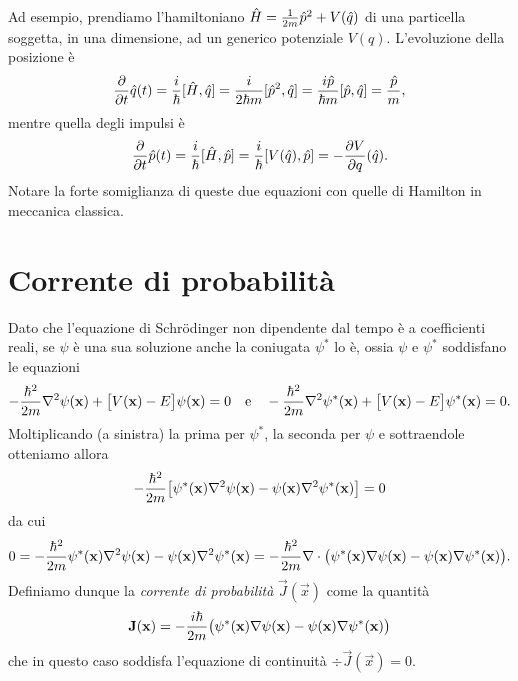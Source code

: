 Ad esempio, prendiamo l'hamiltoniano $\hat{H}=\frac1{2m}\hat{p}^2+V(\hat{q})$ di una particella soggetta, in una dimensione, ad un generico potenziale $V(q)$.
L'evoluzione della posizione è
\begin{equation}
	\frac{\partial {}}{\partial {t}}\hat{q}(t)=\frac{i}{\hbar}[\hat{H},\hat{q}]=\frac{i}{2\hbar m}[\hat{p}^2,\hat{q}]=\frac{i\hat{p}}{\hbar m}[\hat{p},\hat{q}]=\frac{\hat{p}}{m},
\end{equation}
mentre quella degli impulsi è
\begin{equation}
	\frac{\partial {}}{\partial {t}}\hat{p}(t)=\frac{i}{\hbar}[\hat{H},\hat{p}]=\frac{i}{\hbar}[V(\hat{q}),\hat{p}]=-\frac{\partial {V}}{\partial {q}}(\hat{q}).
\end{equation}
Notare la forte somiglianza di queste due equazioni con quelle di Hamilton in meccanica classica.

\section{Corrente di probabilità}
Dato che l'equazione di Schr\"odinger non dipendente dal tempo è a coefficienti reali, se $\psi$ è una sua soluzione anche la coniugata $\psi^*$ lo è, ossia $\psi$ e $\psi^*$ soddisfano le equazioni
\begin{equation}
	-\frac{\hbar^2}{2m}\nabla^2\psi(\mathbf{x})+\big[V(\mathbf{x})-E\big]\psi(\mathbf{x})=0\quad\text{e}\quad	-\frac{\hbar^2}{2m}\nabla^2\psi^*(\mathbf{x})+\big[V(\mathbf{x})-E\big]\psi^*(\mathbf{x})=0.
\end{equation}
Moltiplicando (a sinistra) la prima per $\psi^*$, la seconda per $\psi$ e sottraendole otteniamo allora
\begin{equation}
	-\frac{\hbar^2}{2m}\big[\psi^*(\mathbf{x})\nabla^2\psi(\mathbf{x})-\psi(\mathbf{x})\nabla^2\psi^*(\mathbf{x})\big]=0
\end{equation}
da cui
\begin{equation}
	0=-\frac{\hbar^2}{2m}\psi^*(\mathbf{x})\nabla^2\psi(\mathbf{x})-\psi(\mathbf{x})\nabla^2\psi^*(\mathbf{x})=-\frac{\hbar^2}{2m}\nabla\cdot\big(\psi^*(\mathbf{x})\nabla\psi(\mathbf{x})-\psi(\mathbf{x})\nabla\psi^*(\mathbf{x})\big).
\end{equation}
Definiamo dunque la \emph{corrente di probabilità} $\vec J(\vec x)$ come la quantità
\begin{equation}
	\mathbf{J}(\mathbf{x})=-\frac{i\hbar}{2m}\big(\psi^*(\mathbf{x})\nabla\psi(\mathbf{x})-\psi(\mathbf{x})\nabla\psi^*(\mathbf{x})\big)
	\label{eq:corrente-probabilita}
\end{equation}
che in questo caso soddisfa l'equazione di continuità $\div\vec J(\vec x)=0$.

